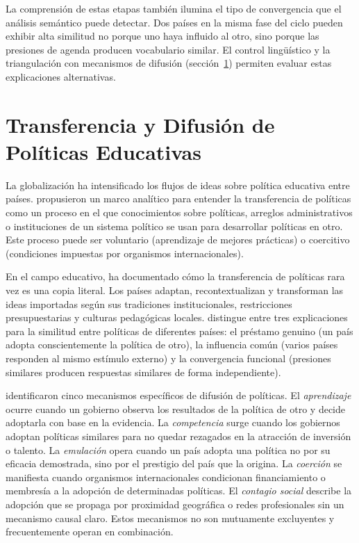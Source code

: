 La comprensión de estas etapas también ilumina el tipo de convergencia que el análisis semántico puede detectar. Dos países en la misma fase del ciclo pueden exhibir alta similitud no porque uno haya influido al otro, sino porque las presiones de agenda producen vocabulario similar. El control lingüístico y la triangulación con mecanismos de difusión (sección~\ref{sec:difusion}) permiten evaluar estas explicaciones alternativas.


\section{Transferencia y Difusión de Políticas Educativas}
\label{sec:difusion}

La globalización ha intensificado los flujos de ideas sobre política educativa entre países. \citet{dolowitz2000learning} propusieron un marco analítico para entender la transferencia de políticas como un proceso en el que conocimientos sobre políticas, arreglos administrativos o instituciones de un sistema político se usan para desarrollar políticas en otro. Este proceso puede ser voluntario (aprendizaje de mejores prácticas) o coercitivo (condiciones impuestas por organismos internacionales).

En el campo educativo, \citet{steiner2004global} ha documentado cómo la transferencia de políticas rara vez es una copia literal. Los países adaptan, recontextualizan y transforman las ideas importadas según sus tradiciones institucionales, restricciones presupuestarias y culturas pedagógicas locales. \citet{steinerkhamsi2014cross} distingue entre tres explicaciones para la similitud entre políticas de diferentes países: el préstamo genuino (un país adopta conscientemente la política de otro), la influencia común (varios países responden al mismo estímulo externo) y la convergencia funcional (presiones similares producen respuestas similares de forma independiente).

\citet{shipan2012diffusion} identificaron cinco mecanismos específicos de difusión de políticas. El \textit{aprendizaje} ocurre cuando un gobierno observa los resultados de la política de otro y decide adoptarla con base en la evidencia. La \textit{competencia} surge cuando los gobiernos adoptan políticas similares para no quedar rezagados en la atracción de inversión o talento. La \textit{emulación} opera cuando un país adopta una política no por su eficacia demostrada, sino por el prestigio del país que la origina. La \textit{coerción} se manifiesta cuando organismos internacionales condicionan financiamiento o membresía a la adopción de determinadas políticas. El \textit{contagio social} describe la adopción que se propaga por proximidad geográfica o redes profesionales sin un mecanismo causal claro. Estos mecanismos no son mutuamente excluyentes y frecuentemente operan en combinación.

